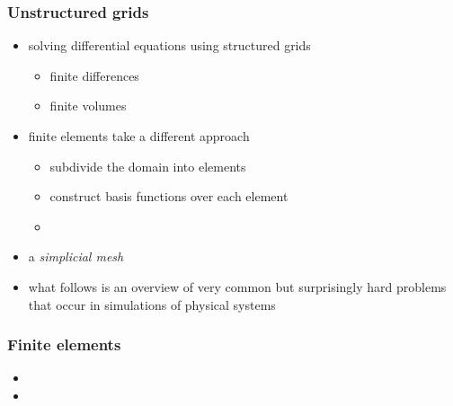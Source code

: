%
%
%
%


\begin{frame}[fragile]
%
  \frametitle{Unstructured grids}
%
  \begin{itemize}
%
  \item solving differential equations using structured grids
    \begin{itemize}
    \item finite differences
    \item finite volumes
    \end{itemize}
%
  \item finite elements take a different approach
    \begin{itemize}
    \item subdivide the domain into elements
    \item construct basis functions over each element
    \item 
    \end{itemize}
%
  \item a {\em simplicial mesh}
%
  \item what follows is an overview of very common but surprisingly hard problems that occur in
    simulations of physical systems
  \end{itemize}
%
\end{frame}

\begin{frame}[fragile]
%
  \frametitle{Finite elements}
%
  \begin{itemize}
%
  \item 
%
  \item 
%
  \end{itemize}
%
\end{frame}

